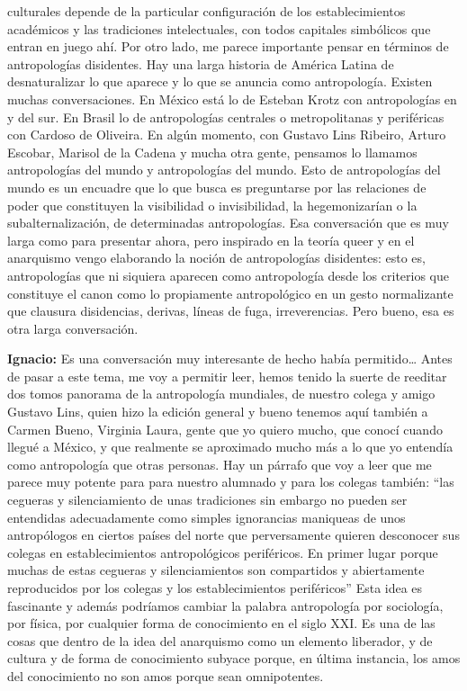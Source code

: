 \documentclass[
]{interact}
\begin{document}
culturales depende de la particular configuración de los
establecimientos académicos y las tradiciones intelectuales, con todos
capitales simbólicos que entran en juego ahí. Por otro lado, me parece
importante pensar en términos de antropologías disidentes. Hay una larga
historia de América Latina de desnaturalizar lo que aparece y lo que se
anuncia como antropología. Existen muchas conversaciones. En México está
lo de Esteban Krotz con antropologías en y del sur. En Brasil lo de
antropologías centrales o metropolitanas y periféricas con Cardoso de
Oliveira. En algún momento, con Gustavo Lins Ribeiro, Arturo Escobar,
Marisol de la Cadena y mucha otra gente, pensamos lo llamamos
antropologías del mundo y antropologías del mundo. Esto de antropologías
del mundo es un encuadre que lo que busca es preguntarse por las
relaciones de poder que constituyen la visibilidad o invisibilidad, la
hegemonizarían o la subalternalización, de determinadas antropologías.
Esa conversación que es muy larga como para presentar ahora, pero
inspirado en la teoría queer y en el anarquismo vengo elaborando la
noción de antropologías disidentes: esto es, antropologías que ni
siquiera aparecen como antropología desde los criterios que constituye
el canon como lo propiamente antropológico en un gesto normalizante que
clausura disidencias, derivas, líneas de fuga, irreverencias. Pero
bueno, esa es otra larga conversación.

\textbf{Ignacio:} Es una conversación muy interesante de hecho había
permitido\ldots{} Antes de pasar a este tema, me voy a permitir leer,
hemos tenido la suerte de reeditar dos tomos panorama de la antropología
mundiales, de nuestro colega y amigo Gustavo Lins, quien hizo la edición
general y bueno tenemos aquí también a Carmen Bueno, Virginia Laura,
gente que yo quiero mucho, que conocí cuando llegué a México, y que
realmente se aproximado mucho más a lo que yo entendía como antropología
que otras personas. Hay un párrafo que voy a leer que me parece muy
potente para para nuestro alumnado y para los colegas también: ``las
cegueras y silenciamiento de unas tradiciones sin embargo no pueden ser
entendidas adecuadamente como simples ignorancias maniqueas de unos
antropólogos en ciertos países del norte que perversamente quieren
desconocer sus colegas en establecimientos antropológicos periféricos.
En primer lugar porque muchas de estas cegueras y silenciamientos son
compartidos y abiertamente reproducidos por los colegas y los
establecimientos periféricos'' Esta idea es fascinante y además
podríamos cambiar la palabra antropología por sociología, por física,
por cualquier forma de conocimiento en el siglo XXI. Es una de las cosas
que dentro de la idea del anarquismo como un elemento liberador, y de
cultura y de forma de conocimiento subyace porque, en última instancia,
los amos del conocimiento no son amos porque sean omnipotentes.
\end{document}
